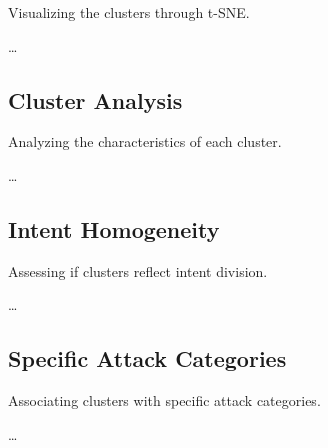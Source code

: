         Visualizing the clusters through t-SNE.

        \ldots
        
    \subsection{Cluster Analysis}
    
        Analyzing the characteristics of each cluster.

        \ldots
        
    \subsection{Intent Homogeneity}
    
        Assessing if clusters reflect intent division.

        \ldots
        
    \subsection{Specific Attack Categories}
    
        Associating clusters with specific attack categories.

        \ldots
